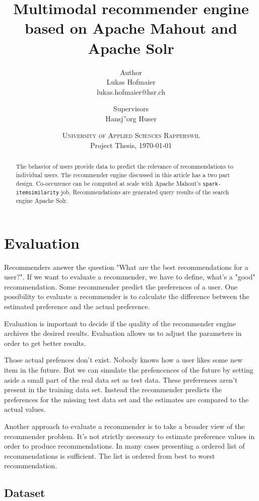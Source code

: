 \documentclass[twoside,a4paper]{article}
\title{ Multimodal recommender engine based on Apache Mahout and Apache Solr }
\author{
	Author \\
	Lukas Hofmaier \\
	lukas.hofmaier@hsr.ch
 	\and
	Supervisors \\
        Hansj''org Huser
}
\date{
	\textsc{University of Applied Sciences Rapperswil}\\
	Project Thesis,
	\today
}
\begin{document}
\maketitle
\tableofcontents

\begin{abstract}
The behavior of users provide data to predict the relevance of recommendations to individual users. The recommender engine discussed in this article has a two part design.
Co-occurence can be computed at scale with Apache Mahout's \verb|spark-itemsimilarity| job.
Recommendations are generated query results of the search engine Apache Solr.
\end{abstract}





\section{Evaluation}
\label{sec:evaluation}
Recommenders answer the question "What are the best recommendations for a user?". If we want to evaluate a recommender, we have to define, what's a "good" recommendation.
Some recommender predict the preferences of a user. One possibility to evaluate a recommender is to calculate the difference between the estimated preference and the actual preference.

Evaluation is important to decide if the quality of the recommender engine archives the desired results. Evaluation allows us to adjust the parameters in order to get better results.

Those actual prefences don't exist. Nobody knows how a user likes some new item in the future.
But we can simulate the prefencences of the future by setting aside a small part of the real data set as test data. These preferences aren't present in the training data set. Instead the recommender predicts the preferences for the missing test data set and the estimates are compared to the actual values.

Another approach to evaluate a recommender is to take a broader view of the recommender problem. It's not strictly necessary to estimate preference values in order to produce recommendations. In many cases presenting a ordered list of recommendations is sufficient. The list is ordered from best to worst recommendation.


\subsection{Dataset}
\label{sec:dataset}
\end{document}
